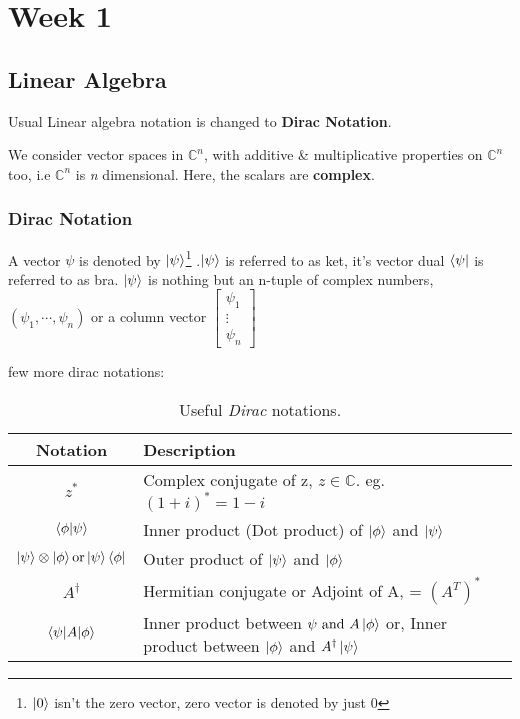 \part{Week 1}
\chapter{Linear Algebra}
Usual Linear algebra notation is changed to \textbf{Dirac Notation}.

We consider vector spaces in $\mathbb{C}^n$, with additive \& multiplicative properties on $\mathbb{C}^n$ too, i.e $\mathbb{C}^n$ is \textit{n} dimensional. Here, the scalars are \textbf{complex}.

\section{Dirac Notation}
A vector $\psi$ is denoted by $\ket{\psi}$\footnote{$\ket{0}$ isn't the zero vector, zero vector is denoted by just 0}
.$\ket{\psi}$ is referred to as ket, it’s vector dual $\bra{\psi} $ is referred to as bra. $\ket{\psi}$ is nothing but an n-tuple of complex numbers, $(\psi_1,\cdots, \psi_n)$ or a column vector $\begin{bmatrix} \psi_1 \\ \vdots \\ \psi_n \end{bmatrix}$

few more dirac notations:
\begin{table}[htbp]
    \centering
    \begin{tabular}{|c|p{8cm}|}\hline
        \textbf{Notation} & \textbf{Description}  \\\hline
        $z^{*}$ & Complex conjugate of z, $z \in \mathbb{C}$. eg.$(1+i)^{*} = 1-i$ \\\hline 
        $\braket{\phi | \psi}$ & Inner product (Dot product) of $\ket{\phi}$ and $\ket{\psi}$ \\\hline
        $\ket{\psi} \otimes \ket{\phi} \text{or}
\ket{\psi}\bra{\phi}$ & Outer product of $\ket{\psi}$ and $\ket{\phi}$ \\\hline
        $A^{\dagger}$ & Hermitian conjugate or Adjoint of A, = $(A^T)^*$ \\\hline
        $\braket{\psi|A|\phi}$ & Inner product between $\psi \text{ and } A\ket{\phi}$ or, Inner product between $\ket{\phi}$ and $A^{\dagger}\ket{\psi}$ \\\hline
    \end{tabular}
    \caption{Useful \textit{Dirac} notations.}
    \label{tab:dirac_notations}
\end{table}

